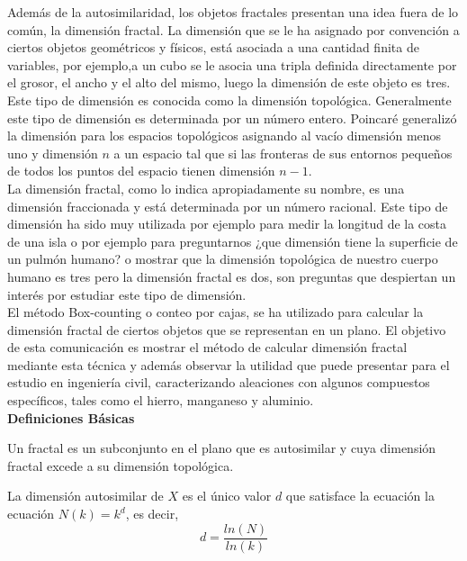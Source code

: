 \begin{titlepage}
\begin{minipage}{0.85\linewidth}
\begin{minipage}{0.85\linewidth}
\begin{resumen}
Adem\'as de la autosimilaridad, los objetos fractales presentan una
idea fuera de lo com\'un, la dimensi\'on fractal.  La dimensi\'on que se
le ha asignado por convenci\'on a ciertos objetos geom\'etricos y
f\'isicos, est\'a asociada a una cantidad finita de variables, por
ejemplo,a un cubo se le asocia una tripla definida directamente por
el grosor, el ancho y el alto del mismo, luego la dimensi\'on de este
objeto es tres.  Este tipo de dimensi\'on es conocida como la
dimensi\'on topol\'ogica. Generalmente este tipo de dimensi\'on es
determinada por un n\'umero entero.  Poincar\'e generaliz\'o la dimensi\'on
para los espacios topol\'ogicos asignando al vac\'io dimensi\'on menos uno
y dimensi\'on $n$ a un espacio tal que si las fronteras de sus
entornos peque\~nos de todos los puntos del espacio tienen dimensi\'on
$n-1$.\\

La dimensi\'on fractal, como lo indica apropiadamente su nombre, es
una dimensi\'on fraccionada y est\'a determinada por un n\'umero racional.
Este tipo de dimensi\'on ha sido muy utilizada por ejemplo para medir
la longitud de la costa de una isla o por ejemplo para preguntarnos
¿que dimensi\'on tiene la superficie de un pulm\'on humano? o mostrar
que la dimensi\'on topol\'ogica de nuestro cuerpo humano es tres pero la
dimensi\'on fractal es dos, son preguntas que despiertan un inter\'es
por estudiar este tipo de dimensi\'on.\\

El m\'etodo Box-counting o conteo por cajas, se ha utilizado para
calcular la dimensi\'on fractal de ciertos objetos que se representan
en un plano.  El objetivo de esta comunicaci\'on es mostrar el m\'etodo
de calcular dimensi\'on fractal mediante esta t\'ecnica y adem\'as
observar la utilidad que puede presentar para el estudio en
ingenier\'ia civil, caracterizando aleaciones con algunos compuestos
espec\'ificos, tales como el hierro, manganeso y aluminio.\\[10pt]
{\bf\large Definiciones B\'asicas}\\[10pt]
\footnotesize 
\begin{definicion}
Un fractal es un subconjunto en el plano que es autosimilar y cuya
dimensi\'on fractal excede a su dimensi\'on topol\'ogica.
\end{definicion}

\begin{definicion}
La dimensi\'on autosimilar de $X$ es el \'unico valor $d$ que satisface
la ecuaci\'on la ecuaci\'on $N(k)=k^d$, es decir,
$$d=\frac{ln(N)}{ln(k)}$$
\end{definicion}


\end{resumen}
\end{minipage}
\end{minipage}
\end{titlepage}
